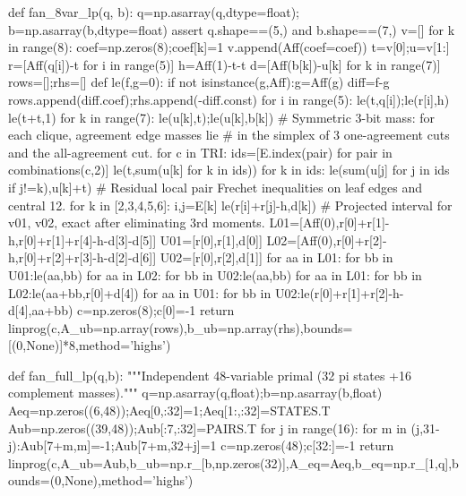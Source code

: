\documentclass[11pt,a4paper]{ctexart}
\theoremstyle{remark}\newtheorem{remark}[theorem]{说明}
\begin{document}
\begin{CodeListing}
def fan_8var_lp(q, b):
    q=np.asarray(q,dtype=float); b=np.asarray(b,dtype=float)
    assert q.shape==(5,) and b.shape==(7,)
    v=[]
    for k in range(8):
        coef=np.zeros(8);coef[k]=1
        v.append(Aff(coef=coef))
    t=v[0];u=v[1:]
    r=[Aff(q[i])-t for i in range(5)]
    h=Aff(1)-t-t
    d=[Aff(b[k])-u[k] for k in range(7)]
    rows=[];rhs=[]
    def le(f,g=0):
        if not isinstance(g,Aff):g=Aff(g)
        diff=f-g
        rows.append(diff.coef);rhs.append(-diff.const)
    for i in range(5):
        le(t,q[i]);le(r[i],h)
    le(t+t,1)
    for k in range(7):
        le(u[k],t);le(u[k],b[k])
    # Symmetric 3-bit mass: for each clique, agreement edge masses lie
    # in the simplex of 3 one-agreement cuts and the all-agreement cut.
    for c in TRI:
        ids=[E.index(pair) for pair in combinations(c,2)]
        le(t,sum(u[k] for k in ids))
        for k in ids:
            le(sum(u[j] for j in ids if j!=k),u[k]+t)
    # Residual local pair Frechet inequalities on leaf edges and central 12.
    for k in [2,3,4,5,6]:
        i,j=E[k]
        le(r[i]+r[j]-h,d[k])
    # Projected interval for v01, v02, exact after eliminating 3rd moments.
    L01=[Aff(0),r[0]+r[1]-h,r[0]+r[1]+r[4]-h-d[3]-d[5]]
    U01=[r[0],r[1],d[0]]
    L02=[Aff(0),r[0]+r[2]-h,r[0]+r[2]+r[3]-h-d[2]-d[6]]
    U02=[r[0],r[2],d[1]]
    for aa in L01:
        for bb in U01:le(aa,bb)
    for aa in L02:
        for bb in U02:le(aa,bb)
    for aa in L01:
        for bb in L02:le(aa+bb,r[0]+d[4])
    for aa in U01:
        for bb in U02:le(r[0]+r[1]+r[2]-h-d[4],aa+bb)
    c=np.zeros(8);c[0]=-1
    return linprog(c,A_ub=np.array(rows),b_ub=np.array(rhs),bounds=[(0,None)]*8,method='highs')


def fan_full_lp(q,b):
    """Independent 48-variable primal (32 pi states +16 complement masses)."""
    q=np.asarray(q,float);b=np.asarray(b,float)
    Aeq=np.zeros((6,48));Aeq[0,:32]=1;Aeq[1:,:32]=STATES.T
    Aub=np.zeros((39,48));Aub[:7,:32]=PAIRS.T
    for j in range(16):
        for m in (j,31-j):Aub[7+m,m]=-1;Aub[7+m,32+j]=1
    c=np.zeros(48);c[32:]=-1
    return linprog(c,A_ub=Aub,b_ub=np.r_[b,np.zeros(32)],A_eq=Aeq,b_eq=np.r_[1,q],bounds=(0,None),method='highs')


\end{CodeListing}
\end{document}
